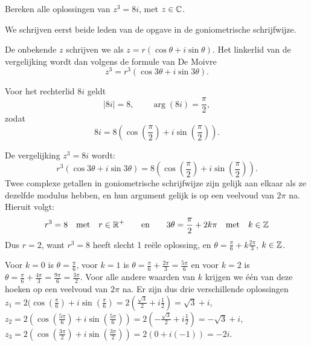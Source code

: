 \documentclass{ximera}
\begin{document}
\begin{basicSkip}
    \begin{exercise} Bereken alle oplossingen van $z^3=8i$, met $z\in \mathbb{C}$.
        \begin{oplossing}
            We schrijven eerst beide leden van de opgave in de goniometrische schrijfwijze.
             
            De onbekende $z$ schrijven we als $z = r(\cos\theta+i\sin\theta)$. Het linkerlid van de vergelijking wordt dan volgens de formule van De Moivre $$z^3 = r^3 (\cos 3\theta+i\sin 3\theta).$$
             
            Voor het rechterlid $8i$ geldt
            \[ |8i| = 8, \qquad \arg (8i) =  \frac{\pi}{2}, \]
            zodat
            \[ 8i = 8( \cos(\frac{\pi}{2}) + i \sin(\frac{\pi}{2})). \]
             
            De
            vergelijking $z^3=8i$ wordt:
            $$r^3 (\cos 3\theta+i\sin 3\theta) = 8( \cos(\frac{\pi}{2}) + i \sin(\frac{\pi}{2})).$$
            Twee complexe getallen in goniometrische schrijfwijze zijn gelijk aan elkaar als ze dezelfde modulus hebben, en hun argument gelijk is op een veelvoud van $2 \pi$ na.
            Hieruit volgt:
            \[ r^3 = 8 \quad \text{met} \quad r\in \mathbb{R}^+ \qquad \text{en} \qquad 3 \theta =  \frac{\pi}{2} + 2 k \pi \quad \text{met} \quad k\in \mathbb{Z}\]
            Dus $r= 2$, want $r^3=8$ heeft slecht 1 reële oplossing, en $\theta =  \frac{\pi}{6} + k \frac{2\pi}{3}$, $k \in \mathbb{Z}$.
             
            Voor $k=0$ is
            $\theta =  \frac{\pi}{6}$, voor $k=1$ is $\theta =
            \frac{\pi}{6} + \frac{2\pi}{3} = \frac{5\pi}{6}$ en voor $k=2$ is $\theta =
            \frac{\pi}{6} + \frac{4\pi}{3} = \frac{9\pi}{6} = \frac{3\pi}{2}$. Voor alle andere waarden van $k$ krijgen we één van deze hoeken op een veelvoud van $2 \pi$ na. Er zijn dus drie verschillende oplossingen
            \\$ z_1 = 2( \cos(\frac{\pi}{6}) + i \sin(\frac{\pi}{6}) = 2(\frac{\sqrt3}{2} + i \frac12)= \sqrt 3 + i$,
            \\$ z_2 = 2( \cos(\frac{5\pi}{6}) + i \sin(\frac{5\pi}{6})) =2(- \frac{\sqrt3}{2} + i \frac12)=-\sqrt 3 +i $,
            \\$ z_3 = 2( \cos(\frac{3\pi}{2}) + i \sin(\frac{3\pi}{2})) =2(0 + i (-1))=-2i $.
        \end{oplossing}
        \end{exercise}
    \end{basicSkip}
\end{document}
